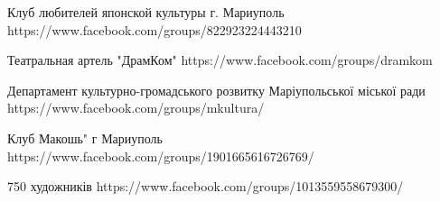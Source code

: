  
 
 
 
 

Клуб любителей японской культуры г. Мариуполь
https://www.facebook.com/groups/822923224443210

Театральная артель "ДрамКом"
https://www.facebook.com/groups/dramkom

Департамент культурно-громадського розвитку Маріупольської міської ради
https://www.facebook.com/groups/mkultura/

Клуб Макошь" г Мариуполь
https://www.facebook.com/groups/1901665616726769/

750 художників
https://www.facebook.com/groups/1013559558679300/
